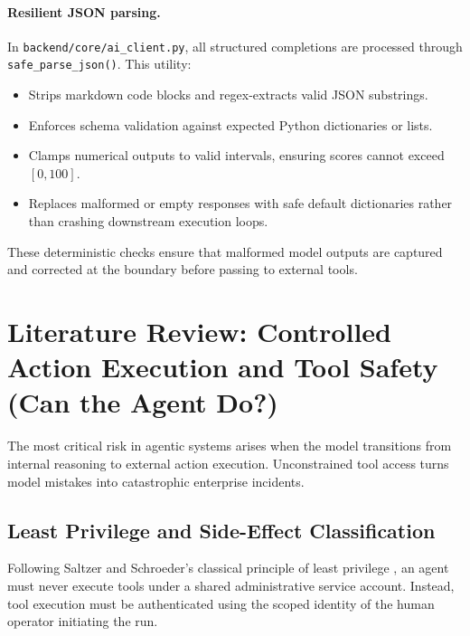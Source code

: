 \documentclass[10pt,a4paper,twocolumn]{article}
\begin{document}
\paragraph{Resilient JSON parsing.} In \texttt{backend/core/ai_client.py}, all structured completions are processed through \texttt{safe\_parse\_json()}. This utility:
\begin{itemize}[leftmargin=*]
  \item Strips markdown code blocks and regex-extracts valid JSON substrings.
  \item Enforces schema validation against expected Python dictionaries or lists.
  \item Clamps numerical outputs to valid intervals, ensuring scores cannot exceed $[0, 100]$.
  \item Replaces malformed or empty responses with safe default dictionaries rather than crashing downstream execution loops.
\end{itemize}
These deterministic checks ensure that malformed model outputs are captured and corrected at the boundary before passing to external tools.

\section{Literature Review: Controlled Action Execution and Tool Safety (Can the Agent Do?)}
\label{sec:do}

The most critical risk in agentic systems arises when the model transitions from internal reasoning to external action execution. Unconstrained tool access turns model mistakes into catastrophic enterprise incidents.

\subsection{Least Privilege and Side-Effect Classification}
Following Saltzer and Schroeder's classical principle of least privilege \cite{saltzer1975protection}, an agent must never execute tools under a shared administrative service account. Instead, tool execution must be authenticated using the scoped identity of the human operator initiating the run.
\end{document}
